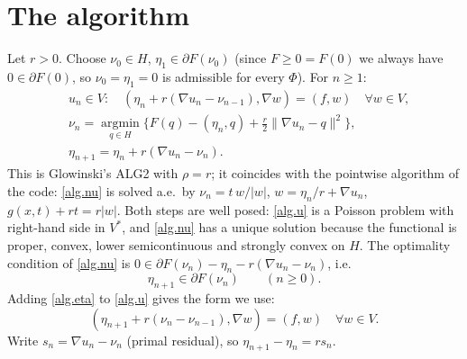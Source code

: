 \documentclass[11pt]{amsart}
\theoremstyle{remark}
\theoremstyle{definition}
\begin{document}
\section{The algorithm}
Let $r>0$. Choose $\nu_0\in H$, $\eta_1\in\partial F(\nu_0)$ (since $F\ge0=F(0)$ we always have $0\in\partial F(0)$, so $\nu_0=\eta_1=0$ is admissible for every $\Phi$). For $n\ge1$:
\begin{align}
&u_n\in V:\quad (\eta_n+r(\nabla u_n-\nu_{n-1}),\nabla w)=(f,w)\quad\forall w\in V,\label{alg.u}\\
&\nu_n=\operatorname*{argmin}_{q\in H}\Big\{F(q)-(\eta_n,q)+\tfrac r2\|\nabla u_n-q\|^2\Big\},\label{alg.nu}\\
&\eta_{n+1}=\eta_n+r(\nabla u_n-\nu_n).\label{alg.eta}
\end{align}
This is Glowinski's ALG2 with $\rho=r$; it coincides with the pointwise algorithm of the code: \eqref{alg.nu} is solved a.e.\ by $\nu_n=t\,w/|w|$, $w=\eta_n/r+\nabla u_n$, $g(x,t)+rt=r|w|$.
Both steps are well posed: \eqref{alg.u} is a Poisson problem with right-hand side in $V^*$, and \eqref{alg.nu} has a unique solution because the functional is proper, convex, lower semicontinuous and strongly convex on $H$. The optimality condition of \eqref{alg.nu} is $0\in\partial F(\nu_n)-\eta_n-r(\nabla u_n-\nu_n)$, i.e.
\begin{equation}\label{eta.in.dF}
\eta_{n+1}\in\partial F(\nu_n)\qquad(n\ge0).
\end{equation}
Adding \eqref{alg.eta} to \eqref{alg.u} gives the form we use:
\begin{equation}\label{alg.u2}
(\eta_{n+1}+r(\nu_n-\nu_{n-1}),\nabla w)=(f,w)\quad\forall w\in V .
\end{equation}
Write $s_n=\nabla u_n-\nu_n$ (primal residual), so $\eta_{n+1}-\eta_n=rs_n$.
\end{document}
